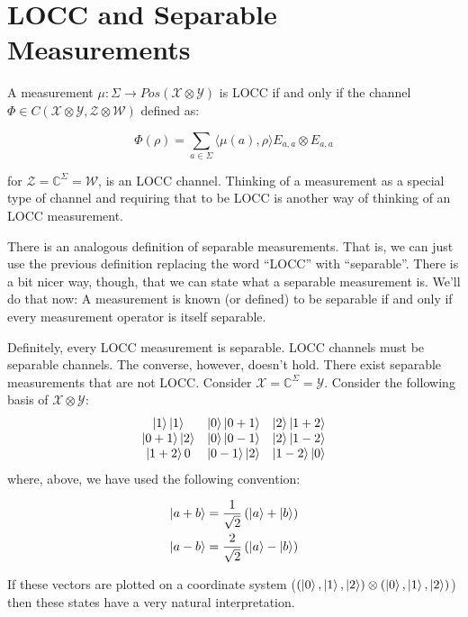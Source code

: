\documentclass{article}
\begin{document}
\section*{LOCC and Separable Measurements}
A measurement $ \mu: \Sigma \rightarrow Pos(\mathcal{X} \otimes \mathcal{Y}) $
is LOCC if and only if the channel $\Phi \in C(\mathcal{X} \otimes \mathcal{Y},
\mathcal{Z} \otimes \mathcal{W})$ defined as:

\[ 
    \Phi(\rho) = \sum_{a\in \Sigma} \langle \mu(a) , \rho \rangle E_{a,a}
    \otimes E_{a,a}
\]

for $\mathcal{Z} = \mathds{C}^\Sigma = \mathcal{W}$, is an LOCC channel.
Thinking of a measurement as a special type of channel and requiring that to be
LOCC is another way of thinking of an LOCC measurement.

There is an analogous definition of separable measurements. That is, we can just
use the previous definition replacing the word ``LOCC'' with ``separable''. There is
a bit nicer way, though, that we can state what a separable measurement is.
We'll do that now: A measurement is known (or defined) to be separable if and
only if every measurement operator is itself separable.

Definitely, every LOCC measurement is separable. LOCC channels must be separable
channels. The converse, however, doesn't hold. There exist separable
measurements that are not LOCC. Consider $\mathcal{X} = \mathds{C}^\Sigma =
\mathcal{Y}$. Consider the following basis of $\mathcal{X} \otimes \mathcal{Y}$:
\[
    \begin{array}{ccc}
        \ket{1}\ket{1} & \ket{0}\ket{0+1} &
        \ket{2}\ket{1+2} \\
        \ket{0+1}\ket{2} & \ket{0}\ket{0-1} &
        \ket{2}\ket{1-2}  \\
        \ket{1+2}{0} & \ket{0-1}\ket{2} & \ket{1-2}\ket{0}
    \end{array}
\]
where, above, we have used the following convention:

\begin{align*}
    \ket{a+b} &= \frac{1}{\sqrt{2}} \left( \ket{a} + \ket{b} \right) \\
    \ket{a-b} &= \frac{2}{\sqrt{2}} \left( \ket{a} - \ket{b} \right)
\end{align*}

If these vectors are plotted on a coordinate system
($(\ket{0},\ket{1},\ket{2})\otimes (\ket{0},\ket{1},\ket{2})$) then these states
have a very natural interpretation.
\end{document}
